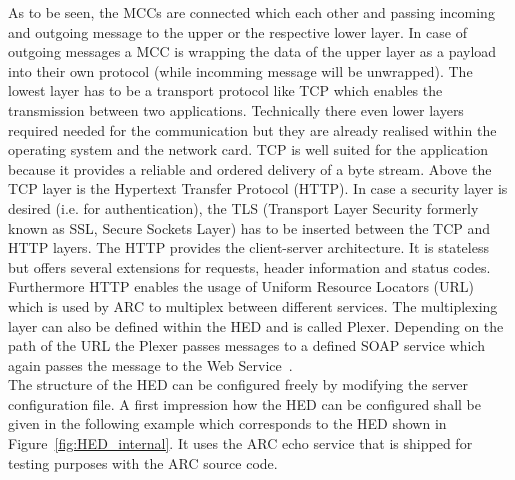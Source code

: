 As to be seen, the MCCs are connected which each other and passing incoming and outgoing message to the upper or the respective lower layer. In case of outgoing messages a MCC is wrapping the data of the upper layer as a payload into their own protocol (while incomming message will be unwrapped).
The lowest layer has to be a transport protocol like TCP which enables the transmission between two applications.
Technically there even lower layers required needed for the communication but they are already realised within the operating system and the  network card.
TCP is well suited for the application because it provides a reliable and ordered delivery of a byte stream.
Above the TCP layer is the Hypertext Transfer Protocol (HTTP). 
In case a security layer is desired (i.e. for authentication), the TLS (Transport Layer Security formerly known as SSL, Secure Sockets Layer) has to be inserted between the TCP and HTTP layers.
The HTTP provides the client-server architecture. It is stateless but offers several extensions for requests, header information and status codes. Furthermore HTTP enables the usage of Uniform Resource Locators (URL) which is used by ARC to multiplex between different services. The multiplexing layer can also be defined within the HED and is called Plexer.
Depending on the path of the URL the Plexer passes messages to a defined SOAP service which again passes the message to the Web Service~\cite{QIANG_2005}.\\


The structure of the HED can be configured freely by modifying the server configuration file.
A first impression how the HED can be configured shall be given in the following example which corresponds to the HED shown in Figure~\ref{fig:HED_internal}.
It uses the ARC echo service that is shipped for testing purposes with the ARC source code.



